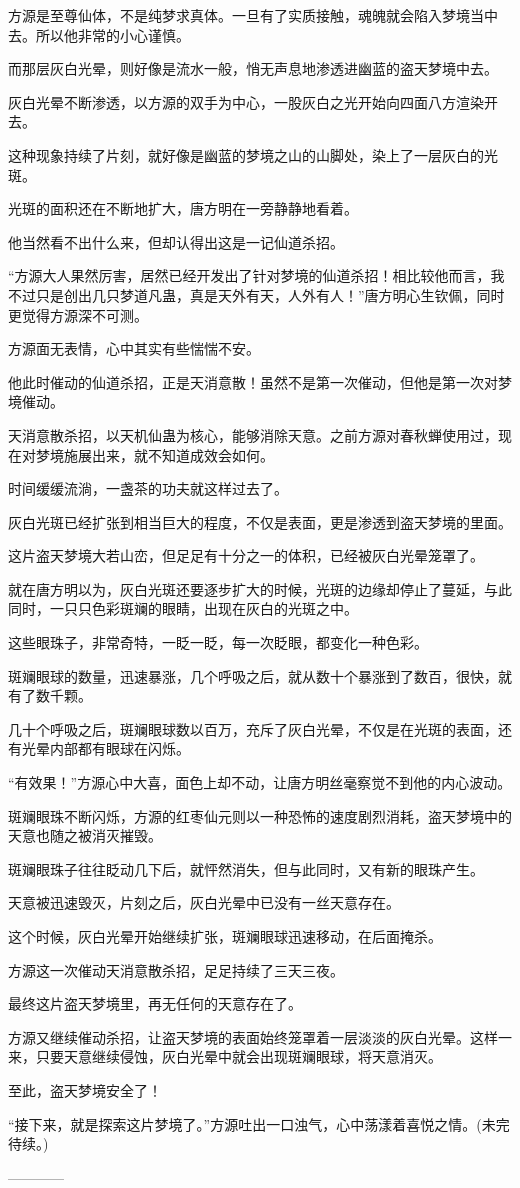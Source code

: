 \begin{this_body}
方源是至尊仙体，不是纯梦求真体。一旦有了实质接触，魂魄就会陷入梦境当中去。所以他非常的小心谨慎。

而那层灰白光晕，则好像是流水一般，悄无声息地渗透进幽蓝的盗天梦境中去。

灰白光晕不断渗透，以方源的双手为中心，一股灰白之光开始向四面八方渲染开去。

这种现象持续了片刻，就好像是幽蓝的梦境之山的山脚处，染上了一层灰白的光斑。

光斑的面积还在不断地扩大，唐方明在一旁静静地看着。

他当然看不出什么来，但却认得出这是一记仙道杀招。

“方源大人果然厉害，居然已经开发出了针对梦境的仙道杀招！相比较他而言，我不过只是创出几只梦道凡蛊，真是天外有天，人外有人！”唐方明心生钦佩，同时更觉得方源深不可测。

方源面无表情，心中其实有些惴惴不安。

他此时催动的仙道杀招，正是天消意散！虽然不是第一次催动，但他是第一次对梦境催动。

天消意散杀招，以天机仙蛊为核心，能够消除天意。之前方源对春秋蝉使用过，现在对梦境施展出来，就不知道成效会如何。

时间缓缓流淌，一盏茶的功夫就这样过去了。

灰白光斑已经扩张到相当巨大的程度，不仅是表面，更是渗透到盗天梦境的里面。

这片盗天梦境大若山峦，但足足有十分之一的体积，已经被灰白光晕笼罩了。

就在唐方明以为，灰白光斑还要逐步扩大的时候，光斑的边缘却停止了蔓延，与此同时，一只只色彩斑斓的眼睛，出现在灰白的光斑之中。

这些眼珠子，非常奇特，一眨一眨，每一次眨眼，都变化一种色彩。

斑斓眼球的数量，迅速暴涨，几个呼吸之后，就从数十个暴涨到了数百，很快，就有了数千颗。

几十个呼吸之后，斑斓眼球数以百万，充斥了灰白光晕，不仅是在光斑的表面，还有光晕内部都有眼球在闪烁。

“有效果！”方源心中大喜，面色上却不动，让唐方明丝毫察觉不到他的内心波动。

斑斓眼珠不断闪烁，方源的红枣仙元则以一种恐怖的速度剧烈消耗，盗天梦境中的天意也随之被消灭摧毁。

斑斓眼珠子往往眨动几下后，就怦然消失，但与此同时，又有新的眼珠产生。

天意被迅速毁灭，片刻之后，灰白光晕中已没有一丝天意存在。

这个时候，灰白光晕开始继续扩张，斑斓眼球迅速移动，在后面掩杀。

方源这一次催动天消意散杀招，足足持续了三天三夜。

最终这片盗天梦境里，再无任何的天意存在了。

方源又继续催动杀招，让盗天梦境的表面始终笼罩着一层淡淡的灰白光晕。这样一来，只要天意继续侵蚀，灰白光晕中就会出现斑斓眼球，将天意消灭。

至此，盗天梦境安全了！

“接下来，就是探索这片梦境了。”方源吐出一口浊气，心中荡漾着喜悦之情。(未完待续。)

------------

\end{this_body}

